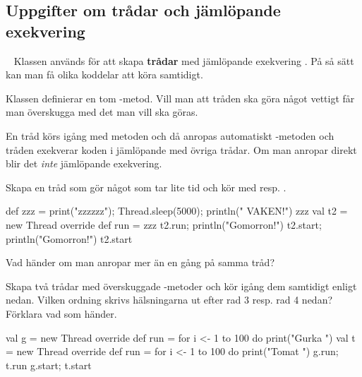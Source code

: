 %
%
%
%
%
%
%
%
%
%
%


\subsection{Uppgifter om trådar och jämlöpande exekvering}


\QUESTBEGIN

\Task  \what~   Klassen  används för att skapa  \textbf{trådar} med jämlöpande exekvering . På så sätt kan man få olika koddelar att köra samtidigt.

Klassen  definierar en tom -metod. Vill man att tråden ska göra något vettigt får man överskugga  med det man vill ska göras.

En tråd körs igång med metoden  och då anropas automatiskt -metoden och tråden exekverar koden i  jämlöpande med övriga trådar. Om man anropar  direkt blir det \emph{inte} jämlöpande exekvering.

\Subtask Skapa en tråd som gör något som tar lite tid och kör med  resp. .
\begin{REPL}
def zzz = { print("zzzzzz"); Thread.sleep(5000); println(" VAKEN!")}
zzz
val t2 = new Thread{ override def run = zzz }
t2.run; println("Gomorron!")
t2.start; println("Gomorron!")
t2.start
\end{REPL}

\Subtask Vad händer om man anropar  mer än en gång på samma tråd?

\Subtask Skapa två trådar med överskuggade -metoder och kör igång dem samtidigt enligt nedan. Vilken ordning skrivs hälsningarna ut efter rad 3 resp. rad 4 nedan? Förklara vad som händer.
\begin{REPL}
val g = new Thread{ override def run = for i <- 1 to 100 do print("Gurka ") }
val t = new Thread{ override def run = for i <- 1 to 100 do print("Tomat ") }
g.run; t.run
g.start; t.start
\end{REPL}

